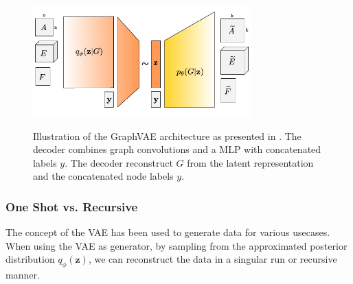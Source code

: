 \begin{figure}[h]
    \centering
    \includegraphics[width=0.75\textwidth]{data/images/SimonovskyGraphVAE.png}
    \label{fig:simonGVAE}
    \caption{Illustration of the GraphVAE architecture as presented in \cite{simonovsky_graphvae_2018}. The decoder combines graph convolutions and a MLP with concatenated labels $y$. The decoder reconstruct ${G}$ from the latent representation and the concatenated node labels $y$.}
\end{figure}







\subsubsection{One Shot vs. Recursive}
The concept of the VAE has been used to generate data for various usecases. When using the VAE as generator, by sampling from the approximated posterior distribution $q_{\phi}\left(\mathbf{z}\right)$, we can reconstruct the data in a singular run or recursive manner.

